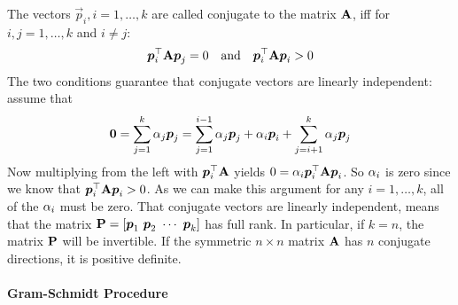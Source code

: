 The vectors $\vec{p}_i, i=1,\dotsc,k$ are called conjugate to the matrix $\mathbf{A}$, iff for $i,j=1,\dotsc,k$ and $i\neq j$:
\begin{align*}
	\boldsymbol{p}_i^\top\mathbf{A}\boldsymbol{p}_j=0\quad\text{and}\quad\boldsymbol{p}_i^\top\mathbf{A}\boldsymbol{p}_i>0
\end{align*}
The two conditions guarantee that conjugate vectors are linearly independent: assume that
\begin{align*}
	\boldsymbol{0}=\sum_{j=1}^k\alpha_j\boldsymbol{p}_j=\sum_{j=1}^{i-1}\alpha_j\boldsymbol{p}_j+\alpha_i\boldsymbol{p}_i+\sum_{j=i+1}^k\alpha_j\boldsymbol{p}_j
\end{align*}
Now multiplying from the left with $\boldsymbol{p}_i^\top\mathbf{A}$ yields $0=\alpha_i\boldsymbol{p}_i^\top\mathbf{A}\boldsymbol{p}_i$. So $\alpha_i$ is zero since we know that $\boldsymbol{p}_i^\top\mathbf{A}\boldsymbol{p}_i>0$. As we can make this argument for any $i=1,\dotsc,k$, all of the $\alpha_i$ must be zero. That conjugate vectors are linearly independent, means that the matrix $\mat{P}=[\vec{p}_1\ \vec{p}_2\ \cdots\ \vec{p}_k]$ has full rank. In particular, if $k=n$, the matrix $\mathbf{P}$ will be invertible. If the symmetric $n\times n$ matrix $\mathbf{A}$ has $n$ conjugate directions, it is positive definite.

\paragraph{Gram-Schmidt Procedure}

